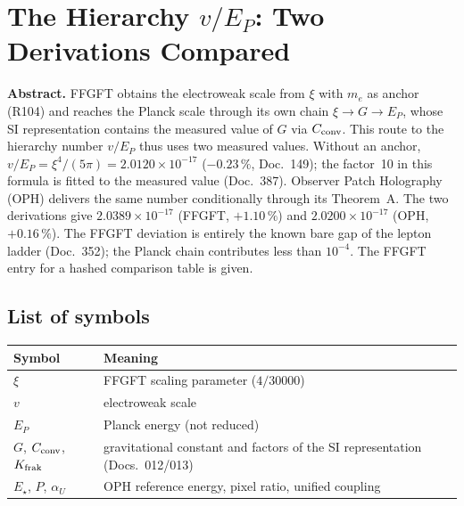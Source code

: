 \providecommand{\BM}{\textbf{[B]}}
\providecommand{\KM}{\textbf{[K]}}
\providecommand{\SM}{\textbf{[S]}}
\providecommand{\XM}{\textbf{[X]}}
\providecommand{\QM}{\textbf{[Q]}}

\chapter*{The Hierarchy $v/E_P$: Two Derivations Compared}

{\small\noindent\textbf{Abstract.}\quad\ignorespaces
FFGFT obtains the electroweak scale from $\xi$ with $m_e$ as anchor (R104)
and reaches the Planck scale through its own chain $\xi\to G\to E_P$, whose SI
representation contains the measured value of $G$ via $C_{\rm conv}$. This
route to the hierarchy number $v/E_P$ thus uses two measured values. Without
an anchor, $v/E_P=\xi^4/(5\pi)=2.0120\times10^{-17}$ ($-0.23\,\%$, Doc.~149);
the factor~10 in this formula is fitted to the measured value (Doc.~387). Observer Patch Holography (OPH) delivers the same number
conditionally through its Theorem~A. The two derivations give
$2.0389\times10^{-17}$ (FFGFT, $+1.10\,\%$) and $2.0200\times10^{-17}$ (OPH,
$+0.16\,\%$). The FFGFT deviation is entirely the known bare gap of the lepton
ladder (Doc.~352); the Planck chain contributes less than $10^{-4}$. The FFGFT
entry for a hashed comparison table is given.
}\medskip

\section*{List of symbols}

\medskip


\medskip
\begin{tabular}{@{}lp{10cm}@{}}
\toprule
\textbf{Symbol} & \textbf{Meaning} \\
\midrule
$\xi$ & FFGFT scaling parameter ($4/30000$) \\
$v$ & electroweak scale \\
$E_P$ & Planck energy (not reduced) \\
$G$, $C_{\rm conv}$, $K_{\rm frak}$ & gravitational constant and factors of the SI representation (Docs.~012/013) \\
$E_\star$, $P$, $\alpha_U$ & OPH reference energy, pixel ratio, unified coupling \\
\bottomrule
\end{tabular}

